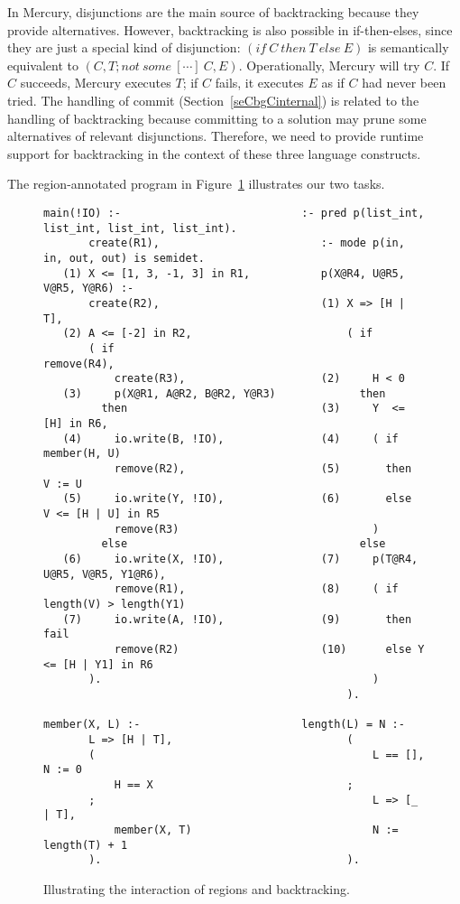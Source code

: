 \documentclass{tlp}
\begin{document}
In Mercury, disjunctions are the main source of backtracking
because they provide alternatives.
However, backtracking is also possible in if-then-elses,
since they are just a special kind of disjunction:
$({if}~C~{then}~T~{else}~E)$
is semantically equivalent to
$(C, T ; {not}~{some}~[\cdots]~C, E)$.
Operationally, Mercury will try $C$.
If $C$ succeeds, Mercury executes $T$;
if $C$ fails, it executes $E$ as if $C$ had never been tried.
The handling of commit (Section~\ref{seCbgCinternal})
is related to the handling of backtracking
because committing to a solution may prune
some alternatives of relevant disjunctions.
Therefore, we need to provide runtime support for backtracking
in the context of these three language constructs.

The region-annotated program in Figure~\ref{fig:running2:annotated}
illustrates our two tasks.

\begin{figure}[htb]
\scriptsize
\vspace{2mm}
\begin{Verbatim}[frame=single,framerule=0.2pt,framesep=3pt]
   main(!IO) :-                            :- pred p(list_int, list_int, list_int, list_int).
       create(R1),                         :- mode p(in, in, out, out) is semidet.
   (1) X <= [1, 3, -1, 3] in R1,           p(X@R4, U@R5, V@R5, Y@R6) :-
       create(R2),                         (1) X => [H | T],
   (2) A <= [-2] in R2,                        ( if
       ( if                                        remove(R4),
           create(R3),                     (2)     H < 0
   (3)     p(X@R1, A@R2, B@R2, Y@R3)             then
         then                              (3)     Y  <= [H] in R6,
   (4)     io.write(B, !IO),               (4)     ( if    member(H, U)
           remove(R2),                     (5)       then  V := U
   (5)     io.write(Y, !IO),               (6)       else  V <= [H | U] in R5
           remove(R3)                              )
         else                                    else
   (6)     io.write(X, !IO),               (7)     p(T@R4, U@R5, V@R5, Y1@R6),
           remove(R1),                     (8)     ( if length(V) > length(Y1)
   (7)     io.write(A, !IO),               (9)       then fail
           remove(R2)                      (10)      else Y <= [H | Y1] in R6
       ).                                          )
                                               ).

member(X, L) :-                         length(L) = N :-
       L => [H | T],                           (
       (                                           L == [], N := 0
           H == X                              ;
       ;                                           L => [_ | T],
           member(X, T)                            N := length(T) + 1
       ).                                      ).
\end{Verbatim}
\small
\caption{Illustrating the interaction of regions and backtracking.}
\label{fig:running2:annotated}
\normalsize
\end{figure}
\end{document}
